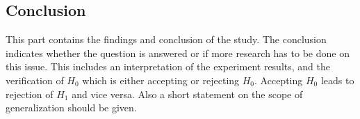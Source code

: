 
\subsection{Conclusion}
\label{subsec:conclusion}

This part contains the findings and conclusion of the study. The conclusion indicates whether the question is answered or if more research has to be done on this issue. This includes an interpretation of the experiment results, and the verification of $H_0$ which is either accepting or rejecting $H_0$. Accepting $H_0$ leads to rejection of $H_1$ and vice versa. Also a short statement on the scope of generalization should be given.